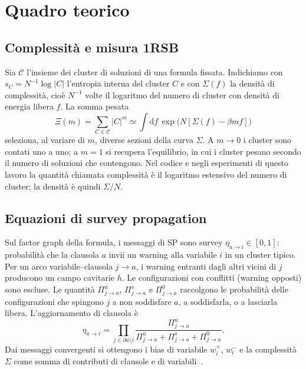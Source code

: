 \documentclass{article}
\newcommand{\Sig}{\Sigma}
\begin{document}
\section{Quadro teorico}
\label{sec:theory}

\subsection{Complessit\`a e misura 1RSB}

Sia $\mathcal{C}$ l'insieme dei cluster di soluzioni di una formula fissata.
Indichiamo con $s_C=N^{-1}\log|C|$ l'entropia interna del cluster $C$ e con $\Sig(f)$ la densit\`a di complessit\`a, cio\`e $N^{-1}$ volte il logaritmo del numero di cluster con densit\`a di energia libera $f$.
La somma pesata
\begin{equation}
  \Xi(m)=\sum_{C\in\mathcal{C}}|C|^m
  \simeq\int\mathrm{d}f\,\exp\bigl(N[\Sig(f)-\beta m f]\bigr)
\end{equation}
seleziona, al variare di $m$, diverse sezioni della curva $\Sig$.
A $m\to 0$ i cluster sono contati uno a uno; a $m=1$ si recupera l'equilibrio, in cui i cluster pesano secondo il numero di soluzioni che contengono.
Nel codice e negli esperimenti di questo lavoro la quantit\`a chiamata complessit\`a \`e il logaritmo estensivo del numero di cluster; la densit\`a \`e quindi $\Sig/N$.

\subsection{Equazioni di survey propagation}

Sul factor graph della formula, i messaggi di SP sono survey $\eta_{a\to i}\in[0,1]$: probabilit\`a che la clausola $a$ invii un warning alla variabile $i$ in un cluster tipico.
Per un arco variabile--clausola $j\to a$, i warning entranti dagli altri vicini di $j$ producono un campo cavitarie $h$.
Le configurazioni con conflitti (warning opposti) sono escluse.
Le quantit\`a $\Pi^u_{j\to a}$, $\Pi^s_{j\to a}$ e $\Pi^0_{j\to a}$ raccolgono le probabilit\`a delle configurazioni che spingono $j$ a non soddisfare $a$, a soddisfarla, o a lasciarla libera.
L'aggiornamento di clausola \`e
\begin{equation}
  \eta_{a\to i}
  =\prod_{j\in\partial a\setminus i}
  \frac{\Pi^u_{j\to a}}{\Pi^u_{j\to a}+\Pi^s_{j\to a}+\Pi^0_{j\to a}}.
  \label{eq:sp-eta}
\end{equation}
Dai messaggi convergenti si ottengono i bias di variabile $w_i^+$, $w_i^-$ e la complessit\`a $\Sig$ come somma di contributi di clausole e di variabili~\cite{braunstein2005survey,marino2016bsp}.
\end{document}
